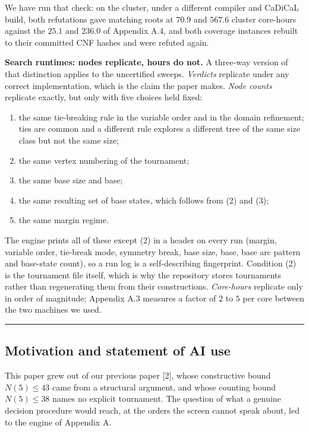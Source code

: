 \documentclass[
]{article}
\providecommand{\tightlist}{%
  \setlength{\itemsep}{0pt}\setlength{\parskip}{0pt}}
\begin{document}
We have run that check: on the cluster, under a different compiler and
CaDiCaL build, both refutations gave matching roots at \(70.9\) and
\(567.6\) cluster core-hours against the \(25.1\) and \(236.0\) of
Appendix A.4, and both coverage instances rebuilt to their committed CNF
hashes and were refuted again.

\textbf{Search runtimes: nodes replicate, hours do not.} A three-way
version of that distinction applies to the uncertified sweeps.
\emph{Verdicts} replicate under any correct implementation, which is the
claim the paper makes. \emph{Node counts} replicate exactly, but only
with five choices held fixed:

\begin{enumerate}
\def\labelenumi{\arabic{enumi}.}
\tightlist
\item
  the same tie-breaking rule in the variable order and in the domain
  refinement; ties are common and a different rule explores a different
  tree of the same size class but not the same size;
\item
  the same vertex numbering of the tournament;
\item
  the same base size and base;
\item
  the same resulting set of base states, which follows from (2) and (3);
\item
  the same margin regime.
\end{enumerate}

The engine prints all of these except (2) in a header on every run
(margin, variable order, tie-break mode, symmetry break, base size,
base, base arc pattern and base-state count), so a run log is a
self-describing fingerprint. Condition (2) is the tournament file
itself, which is why the repository stores tournaments rather than
regenerating them from their constructions. \emph{Core-hours} replicate
only in order of magnitude; Appendix A.3 measures a factor of \(2\) to
\(5\) per core between the two machines we used.

\begin{center}\rule{0.5\linewidth}{0.5pt}\end{center}

\subsection{Motivation and statement of AI
use}\label{motivation-and-statement-of-ai-use}

This paper grew out of our previous paper {[}2{]}, whose constructive
bound \(N(5) \le 43\) came from a structural argument, and whose
counting bound \(N(5) \le 38\) names no explicit tournament. The
question of what a genuine decision procedure would reach, at the orders
the screen cannot speak about, led to the engine of Appendix A.
\end{document}
